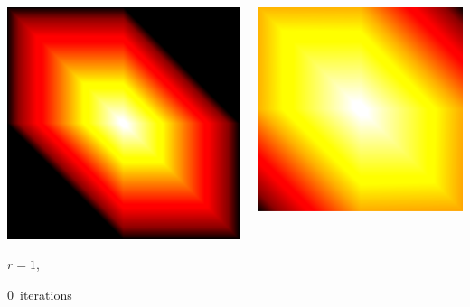 \documentclass[aspectratio=169,t]{beamer}
\begin{document}
{\begin{columns}
\begin{column}{0.22\textwidth}
			\centering
			\includegraphics[width=.85\textwidth]{data/synthetic_meshes/square_tesselation_2tri_Dirac_delta_1_v9_f8_funcvals_0iter_crop.png}
			{\footnotesize 
				\par \vspace{-1mm} $r=1$, 
				\par \vspace{-1mm} $0$~iterations
			}
		\end{column}
		\begin{column}{0.22\textwidth}
			\centering
			\includegraphics[width=.85\textwidth]{data/synthetic_meshes/square_tesselation_2tri_Dirac_delta_1_v9_f8_funcvals_1iter_crop.png}

\end{column}
\end{columns}}
\end{document}
